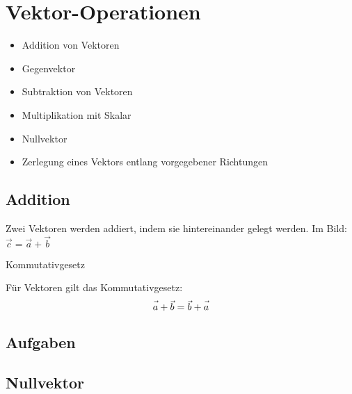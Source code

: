 \section{Vektor-Operationen}

\begin{itemize}
\item Addition von Vektoren
\item Gegenvektor
\item Subtraktion von Vektoren
\item Multiplikation mit Skalar
\item Nullvektor
\item Zerlegung eines Vektors entlang vorgegebener Richtungen
\end{itemize}

\newpage

\subsection{Addition}

Zwei Vektoren werden addiert, indem sie hintereinander gelegt
werden. Im Bild: $\vec{c} = \vec{a} + \vec{b}$


\begin{gesetz}{Kommutativgesetz}{}

  Für Vektoren gilt das Kommutativgesetz:
  $$\vec{a\vphantom{b}} + \vec{b} = \vec{b} + \vec{a\vphantom{b}}$$
  \end{gesetz}

\subsection*{Aufgaben}



\newpage

\subsection{Nullvektor}


